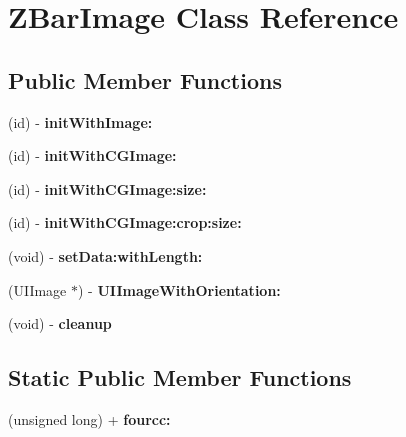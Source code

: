 \hypertarget{interface_z_bar_image}{
\section{ZBarImage Class Reference}
\label{interface_z_bar_image}
}
\subsection*{Public Member Functions}
\begin{DoxyCompactItemize}
\item 
\hypertarget{interface_z_bar_image_a7641dc62b2666d9fb69647f257354b88}{
(id) -\/ {\bfseries initWithImage:}}
\label{interface_z_bar_image_a7641dc62b2666d9fb69647f257354b88}

\item 
\hypertarget{interface_z_bar_image_a9fcf9c3f29e9caff22a9f4798ea0c46d}{
(id) -\/ {\bfseries initWithCGImage:}}
\label{interface_z_bar_image_a9fcf9c3f29e9caff22a9f4798ea0c46d}

\item 
\hypertarget{interface_z_bar_image_a9ab586371fd66ba221cd989c9e31f19f}{
(id) -\/ {\bfseries initWithCGImage:size:}}
\label{interface_z_bar_image_a9ab586371fd66ba221cd989c9e31f19f}

\item 
\hypertarget{interface_z_bar_image_a62921fef6325816d0a28a8d9b67944a4}{
(id) -\/ {\bfseries initWithCGImage:crop:size:}}
\label{interface_z_bar_image_a62921fef6325816d0a28a8d9b67944a4}

\item 
\hypertarget{interface_z_bar_image_a1c0d59dfdf494907022fc84ba14f6620}{
(void) -\/ {\bfseries setData:withLength:}}
\label{interface_z_bar_image_a1c0d59dfdf494907022fc84ba14f6620}

\item 
\hypertarget{interface_z_bar_image_aeb346bf551323af80b88a9a37f580148}{
(UIImage $\ast$) -\/ {\bfseries UIImageWithOrientation:}}
\label{interface_z_bar_image_aeb346bf551323af80b88a9a37f580148}

\item 
\hypertarget{interface_z_bar_image_af0a81f57588e80dda679185177671faf}{
(void) -\/ {\bfseries cleanup}}
\label{interface_z_bar_image_af0a81f57588e80dda679185177671faf}

\end{DoxyCompactItemize}
\subsection*{Static Public Member Functions}
\begin{DoxyCompactItemize}
\item 
\hypertarget{interface_z_bar_image_a724b40ebf2c42bff4cb38d281a1d6478}{
(unsigned long) + {\bfseries fourcc:}}
\label{interface_z_bar_image_a724b40ebf2c42bff4cb38d281a1d6478}

\end{DoxyCompactItemize}
